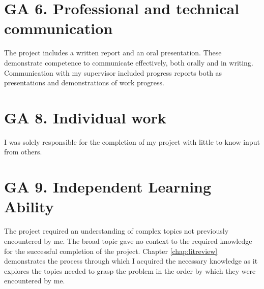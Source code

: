 \section{GA 6. Professional and technical communication}
The project includes a written report and an oral presentation. These demonstrate competence to communicate effectively, both orally and in writing. Communication with my supervisor included progress reports both as presentations and demonstrations of work progress.

\section{GA 8. Individual work}
I was solely responsible for the completion of my project with little to know input from others. 

\section{GA 9. Independent Learning Ability}
The project required an understanding of complex topics not previously encountered by me. The broad topic gave no context to the required knowledge for the successful completion of the project. Chapter \ref{chap:litreview} demonstrates the process through which I acquired the necessary knowledge as it explores the topics needed to grasp the problem in the order by which they were encountered by me.  
